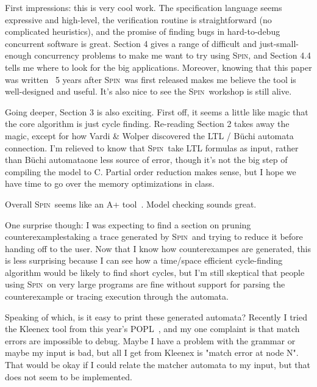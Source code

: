 \documentclass{article}
\newcommand{\spin}{\textsc{Spin}}
\begin{document}
\summary{The Model Checker \spin}
\onehalfspacing

First impressions: this is very cool work.
The specification language seems expressive and high-level,
 the verification routine is straightforward (no complicated heuristics),
 and the promise of finding bugs in hard-to-debug concurrent software is great.
Section 4 gives a range of difficult and just-small-enough concurrency problems
 to make me want to try using \spin, and Section 4.4 tells me where to look for
 the big applications.
Moreover, knowing that this paper was written ~5 years after \spin\ was first released
 makes me believe the tool is well-designed and useful.
It's also nice to see the \spin\ workshop is still alive.

Going deeper, Section 3 is also exciting.
First off, it seems a little like magic that the core algorithm is just cycle finding.
Re-reading Section 2 takes away the magic, except for how Vardi \& Wolper
 discovered the LTL / B\"uchi automata connection.
I'm relieved to know that \spin\ take LTL formulas as input, rather than
 B\"uchi automata\textemdash one less source of error, though it's not the big
 step of compiling the model to C.
Partial order reduction makes sense, but I hope we have time to go over
 the memory optimizations in class.

Overall \spin\ seems like an A+ tool~\cite{h-spin}.
Model checking sounds great.

One surprise though: I was expecting to find a section on pruning
 counterexamples\textemdash taking a trace generated by \spin\ and trying to
 reduce it before handing off to the user.
Now that I know how counterexampes are generated, this is less surprising
 because I can see how a time/space efficient cycle-finding algorithm would
 be likely to find short cycles, but I'm still skeptical that people using
 \spin\ on very large programs are fine without support for parsing the
 counterexample or tracing execution through the automata.

Speaking of which, is it easy to print these generated automata?
Recently I tried the Kleenex tool from this year's POPL~\cite{ghrst-kleenex}, and my one complaint
 is that match errors are impossible to debug.
Maybe I have a problem with the grammar or maybe my input is bad, but
 all I get from Kleenex is "match error at node N".
That would be okay if I could relate the matcher automata to my input, but
 that does not seem to be implemented.
\end{document}
